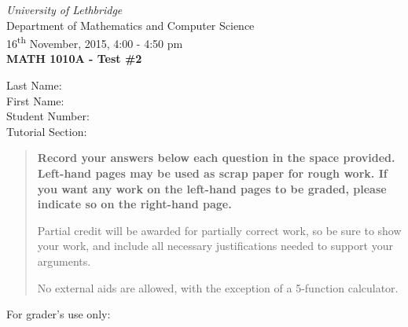 \documentclass[12pt]{article}
\newcommand{\skipline}{\vspace{12pt}}
\begin{document}
\author{Instructor: Sean Fitzpatrick}
\thispagestyle{plain}
\begin{center}
\emph{University of Lethbridge}\\
Department of Mathematics and Computer Science\\
16\textsuperscript{th} November, 2015, 4:00 - 4:50 pm\\
{\bf MATH 1010A - Test \#2}\\
\end{center}
\skipline \skipline \skipline \noindent \skipline
Last Name:\underline{\hspace{50pt}{\bf Solutions}\hspace{248pt}}\\
\skipline
First Name:\underline{\hspace{50pt}{\bf The}\hspace{275pt}}\\
\skipline
Student Number:\underline{\hspace{323pt}}\\
\skipline
Tutorial Section: \underline{\hspace{320pt}}\\


\vspace{0.5in}


\begin{quote}
 {\bf Record your answers below each question in the space provided.    Left-hand pages may be used as scrap paper for rough work.  If you want any work on the left-hand pages to be graded, please indicate so on the right-hand page.
 
 \bigskip
 
Partial credit will be awarded for partially correct work, so be sure to show your work, and include all necessary justifications needed to support your arguments.

\bigskip

No external aids are allowed, with the exception of a 5-function calculator.}
\end{quote}


\vspace{0.5in}

For grader's use only:
\end{document}
